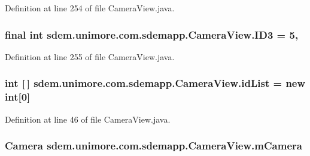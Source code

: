 Definition at line 254 of file Camera\+View.\+java.

\hypertarget{classsdem_1_1unimore_1_1com_1_1sdemapp_1_1_camera_view_a83e18adb3c9936536943699dc730f6bd}{
\subsubsection[{I\+D3}]{\setlength{\rightskip}{0pt plus 5cm}final int sdem.\+unimore.\+com.\+sdemapp.\+Camera\+View.\+I\+D3 = 5\hspace{0.3cm}{\ttfamily [static]}, {\ttfamily [private]}}}\label{classsdem_1_1unimore_1_1com_1_1sdemapp_1_1_camera_view_a83e18adb3c9936536943699dc730f6bd}


Definition at line 255 of file Camera\+View.\+java.

\hypertarget{classsdem_1_1unimore_1_1com_1_1sdemapp_1_1_camera_view_a93a3fb2662449c848c4e853aa41d603c}{
\subsubsection[{id\+List}]{\setlength{\rightskip}{0pt plus 5cm}int \mbox{[}$\,$\mbox{]} sdem.\+unimore.\+com.\+sdemapp.\+Camera\+View.\+id\+List = new int\mbox{[}0\mbox{]}\hspace{0.3cm}{\ttfamily [private]}}}\label{classsdem_1_1unimore_1_1com_1_1sdemapp_1_1_camera_view_a93a3fb2662449c848c4e853aa41d603c}


Definition at line 46 of file Camera\+View.\+java.

\hypertarget{classsdem_1_1unimore_1_1com_1_1sdemapp_1_1_camera_view_a9cff9932f9c42f306bf742f1a5202b04}{
\subsubsection[{m\+Camera}]{\setlength{\rightskip}{0pt plus 5cm}Camera sdem.\+unimore.\+com.\+sdemapp.\+Camera\+View.\+m\+Camera\hspace{0.3cm}{\ttfamily [private]}}}\label{classsdem_1_1unimore_1_1com_1_1sdemapp_1_1_camera_view_a9cff9932f9c42f306bf742f1a5202b04}


